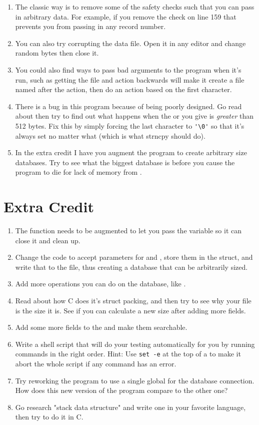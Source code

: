 \begin{enumerate}
\item The classic way is to remove some of the safety checks such that you can
    pass in arbitrary data. For example, if you remove the check on line 159
    that prevents you from passing in any record number.
\item You can also try corrupting the data file.  Open it in any editor and
    change random bytes then close it.
\item You could also find ways to pass bad arguments to the program when it's
    run, such as getting the file and action backwards will make it create
    a file named after the action, then do an action based on the first
    character.
\item There is a bug in this program because of  being poorly
    designed.  Go read about  then try to find out what happens
    when the  or  you give is \emph{greater} than
    512 bytes.  Fix this by simply forcing the last character to \verb|'\0'|
    so that it's always set no matter what (which is what strncpy should do).
\item In the extra credit I have you augment the program to create arbitrary
    size databases.  Try to see what the biggest database is before you
    cause the program to die for lack of memory from .
\end{enumerate}

\section{Extra Credit}

\begin{enumerate}
\item The  function needs to be augmented to let you pass the 
    variable so it can close it and clean up.
\item Change the code to accept parameters for  and , store them in the  struct, and write that to the file, thus creating
    a database that can be arbitrarily sized.
\item Add more operations you can do on the database, like .
\item Read about how C does it's struct packing, and then try to see why your
    file is the size it is.  See if you can calculate a new size after adding
    more fields.
\item Add some more fields to the  and make them searchable.
\item Write a shell script that will do your testing automatically for you
    by running commands in the right order.  Hint: Use \verb|set -e| at the
    top of a  to make it abort the whole script if any command
    has an error.
\item Try reworking the program to use a single global for the database connection.
    How does this new version of the program compare to the other one?
\item Go research "stack data structure" and write one in your favorite language,
    then try to do it in C.
\end{enumerate}
